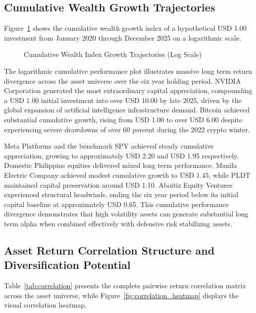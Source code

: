 \subsection{Cumulative Wealth Growth Trajectories}

Figure~\ref{fig:cum_returns} shows the cumulative wealth growth index of a hypothetical USD 1.00 investment from January 2020 through December 2025 on a logarithmic scale.

\begin{figure}[H]
  \centering
  \caption{Cumulative Wealth Index Growth Trajectories (Log Scale)}
  \label{fig:cum_returns}
\end{figure}

The logarithmic cumulative performance plot illustrates massive long term return divergence across the asset universe over the six year holding period. NVIDIA Corporation generated the most extraordinary capital appreciation, compounding a USD 1.00 initial investment into over USD 10.00 by late 2025, driven by the global expansion of artificial intelligence infrastructure demand. Bitcoin achieved substantial cumulative growth, rising from USD 1.00 to over USD 6.00 despite experiencing severe drawdowns of over 60 percent during the 2022 crypto winter.

Meta Platforms and the benchmark SPY achieved steady cumulative appreciation, growing to approximately USD 2.20 and USD 1.95 respectively. Domestic Philippine equities delivered mixed long term performance. Manila Electric Company achieved modest cumulative growth to USD 1.45, while PLDT maintained capital preservation around USD 1.10. Aboitiz Equity Ventures experienced structural headwinds, ending the six year period below its initial capital baseline at approximately USD 0.65. This cumulative performance divergence demonstrates that high volatility assets can generate substantial long term alpha when combined effectively with defensive risk stabilizing assets.

\subsection{Asset Return Correlation Structure and Diversification Potential}

Table~\ref{tab:correlation} presents the complete pairwise return correlation matrix across the asset universe, while Figure~\ref{fig:correlation_heatmap} displays the visual correlation heatmap.

